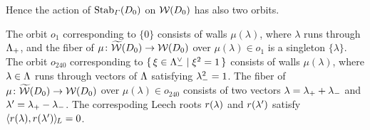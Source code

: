 \documentclass{amsart} %
\begin{document}
Hence the action of $\operatorname{Stab}_{\varGamma}(D_0)$ on $\mathord{\mathcal{W}}(D_0)$ 
has also two orbits.
\par
The orbit $o_1$ corresponding to $\{0\}$
consists of walls $\mu(\lambda)$,
where $\lambda$ runs through $\Lambda_{+}$,
and the fiber of $\mu\colon \widetilde{\mathord{\mathcal{W}}}(D_0)\to\mathord{\mathcal{W}}(D_0)$ 
over $\mu(\lambda)\in o_1$ is a singleton $\{\lambda\}$.
The orbit $o_{240}$ corresponding to $\{\,{\xi\in \Lambda_{-}^{\vee}}\mid {\xi^2=1} \,\}$
consists of walls $\mu(\lambda)$,
where $\lambda\in \Lambda$ runs through
vectors of $\Lambda$ satisfying ${\lambda}_{-}^2=1$.
The fiber of $\mu\colon \widetilde{\mathord{\mathcal{W}}}(D_0)\to\mathord{\mathcal{W}}(D_0)$ 
over $\mu(\lambda)\in o_{240}$ consists 
of two vectors
$\lambda={\lambda}_{+}+{\lambda}_{-}$ and $\lambda^{\prime}={\lambda}_{+}-{\lambda}_{-}$.
The correspoding Leech roots 
$r(\lambda)$ and $r(\lambda^{\prime})$ satisfy
$\langle r(\lambda), r(\lambda^{\prime}) \rangle_{\hskip -1pt L}=0$.
%
%
\end{document}
